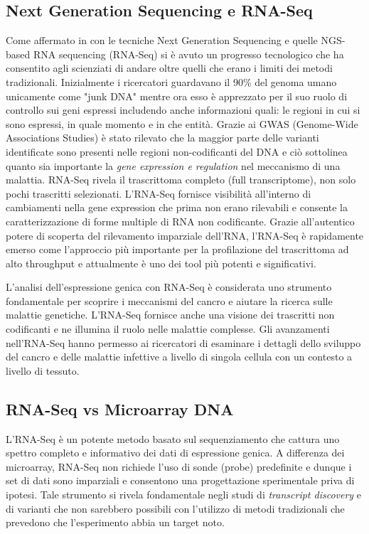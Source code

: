 \subsection{Next Generation Sequencing e RNA-Seq}
Come affermato in \cite{illumina2021rna} con le tecniche Next Generation Sequencing e quelle NGS-based RNA sequencing 
(RNA-Seq) si è avuto un progresso tecnologico che ha consentito agli scienziati 
di andare oltre quelli che erano i limiti dei metodi tradizionali. 
Inizialmente i ricercatori guardavano il 90\% del genoma umano unicamente come 
"junk DNA" mentre ora esso è apprezzato per il suo ruolo di controllo sui geni 
espressi includendo anche informazioni quali: le regioni in cui si sono espressi,
in quale momento e in che entità.
Grazie ai GWAS (Genome-Wide Associations Studies) è stato rilevato che la 
maggior parte delle varianti identificate sono presenti nelle regioni 
non-codificanti del DNA e ciò sottolinea quanto sia importante la \textit{gene expression e regulation} 
nel meccanismo di una malattia.
RNA-Seq rivela il trascrittoma completo (full transcriptome), non solo pochi 
trascritti selezionati. L’RNA-Seq fornisce visibilità all’interno di cambiamenti
nella gene expression che prima non erano rilevabili e consente la 
caratterizzazione di forme multiple di RNA non codificante.
Grazie all'autentico potere di scoperta del rilevamento imparziale dell'RNA, 
l'RNA-Seq è rapidamente emerso come l'approccio più importante per la 
profilazione del trascrittoma ad alto throughput e attualmente è uno 
dei tool più potenti e significativi.

L'analisi dell'espressione genica con RNA-Seq è considerata uno strumento 
fondamentale per scoprire i meccanismi del cancro e aiutare la ricerca sulle 
malattie genetiche. L'RNA-Seq fornisce anche una visione dei trascritti non 
codificanti e ne illumina il ruolo nelle malattie complesse.
Gli avanzamenti nell'RNA-Seq hanno permesso ai ricercatori di esaminare i 
dettagli dello sviluppo del cancro e delle malattie infettive a livello di 
singola cellula con un contesto a livello di tessuto.

\subsection{RNA-Seq vs Microarray DNA}
L’RNA-Seq è un potente metodo basato sul sequenziamento che cattura uno spettro
completo e informativo dei dati di espressione genica. A differenza dei microarray,
RNA-Seq non richiede l'uso di sonde (probe) predefinite e dunque i set di dati
sono imparziali e consentono una progettazione sperimentale priva di ipotesi.
Tale strumento si rivela fondamentale negli studi di \textit{transcript discovery} e di
varianti che non sarebbero possibili con l'utilizzo di metodi tradizionali che
prevedono che l'esperimento abbia un target noto. 

